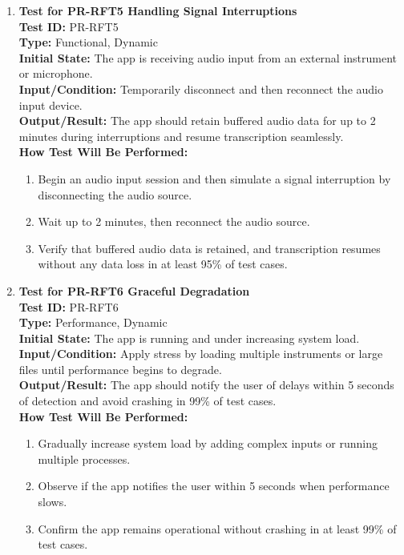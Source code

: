 \documentclass[12pt, titlepage]{article}
\begin{document}
\begin{enumerate}
    \item \textbf{Test for PR-RFT5 Handling Signal Interruptions} \\
      \newline
      \textbf{Test ID:} PR-RFT5 \\
      \textbf{Type:} Functional, Dynamic \\
      \textbf{Initial State:} The app is receiving audio input from an external instrument or microphone. \\
      \textbf{Input/Condition:} Temporarily disconnect and then reconnect the audio input device. \\
      \textbf{Output/Result:} The app should retain buffered audio data for up to 2 minutes during interruptions and resume 
      transcription seamlessly. \\
      \textbf{How Test Will Be Performed:}
      \begin{enumerate}
          \item Begin an audio input session and then simulate a signal interruption by disconnecting the audio source.
          \item Wait up to 2 minutes, then reconnect the audio source.
          \item Verify that buffered audio data is retained, and transcription resumes without any data loss in at least 95\% 
          of test cases.
      \end{enumerate}

    \item \textbf{Test for PR-RFT6 Graceful Degradation} \\
      \newline
      \textbf{Test ID:} PR-RFT6 \\
      \textbf{Type:} Performance, Dynamic \\
      \textbf{Initial State:} The app is running and under increasing system load. \\
      \textbf{Input/Condition:} Apply stress by loading multiple instruments or large files until performance begins to degrade. \\
      \textbf{Output/Result:} The app should notify the user of delays within 5 seconds of detection and avoid crashing in 99\% 
      of test cases. \\
      \textbf{How Test Will Be Performed:}
      \begin{enumerate}
          \item Gradually increase system load by adding complex inputs or running multiple processes.
          \item Observe if the app notifies the user within 5 seconds when performance slows.
          \item Confirm the app remains operational without crashing in at least 99\% of test cases.
      \end{enumerate}


\end{enumerate}
\end{document}
